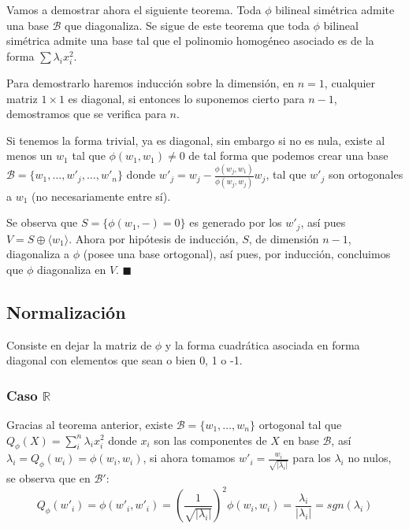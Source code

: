 \documentclass{preset}
\begin{document}
Vamos a demostrar ahora el siguiente teorema. Toda $\phi$ bilineal simétrica admite una base $\mathcal{B}$ que diagonaliza. Se sigue de este teorema que toda $\phi$ bilineal simétrica admite una base tal que el polinomio homogéneo asociado es de la forma $\sum \lambda_i x_i^2$.

Para demostrarlo haremos inducción sobre la dimensión, en $n=1$, cualquier matriz $1 \times 1$ es diagonal, si entonces lo suponemos cierto para $n-1$, demostramos que se verifica para $n$.

\noindent Si tenemos la forma trivial, ya es diagonal, sin embargo si no es nula, existe al menos un $w_1$ tal que $\phi(w_1,w_1)\neq 0$ de tal forma que podemos crear una base $\mathcal{B}=\{w_1,\dots,w'_j,\dots,w'_n\}$ donde $w'_j=w_j-\frac{\phi(w_j,w_1)}{\phi(w_j,w_j)}w_j$, tal que $w'_j$ son ortogonales a $w_1$ (no necesariamente entre sí).

Se observa que $S = \{\phi(w_1,-)=0\}$ es generado por los $w'_j$, así pues $V= S \oplus \langle w_1 \rangle$. Ahora por hipótesis de inducción, $S$, de dimensión $n-1$, diagonaliza a $\phi$ (posee una base ortogonal), así pues, por inducción, concluimos que $\phi$ diagonaliza en $V$.    $\blacksquare$

\vspace{-15pt}
\subsection{Normalización}

Consiste en dejar la matriz de $\phi$ y la forma cuadrática asociada en forma diagonal con elementos que sean o bien 0, 1 o -1.

\vspace{-10pt}
\subsubsection{Caso $\mathbb{R}$}

Gracias al teorema anterior, existe $\mathcal{B}=\{w_1,\dots,w_n\}$ ortogonal tal que $Q_\phi(X) = \sum_i^n \lambda_i x_i^2$ donde $x_i$ son las componentes de $X$ en base $\mathcal{B}$, así $\lambda_i = Q_\phi(w_i)=\phi(w_i,w_i)$, si ahora tomamos $w'_i=\frac{w_i}{\sqrt{|\lambda_i|}}$ para los $\lambda_i$ no nulos, se observa que en $\mathcal{B}'$:
\vspace{-10pt}
\[Q_\phi(w'_i)=\phi(w'_i,w'_i)=\left(\frac{1}{\sqrt{|\lambda_i|}}\right)^2 \phi(w_i,w_i) = \frac{\lambda_i}{|\lambda_i|}=sgn(\lambda_i)\]
\end{document}
